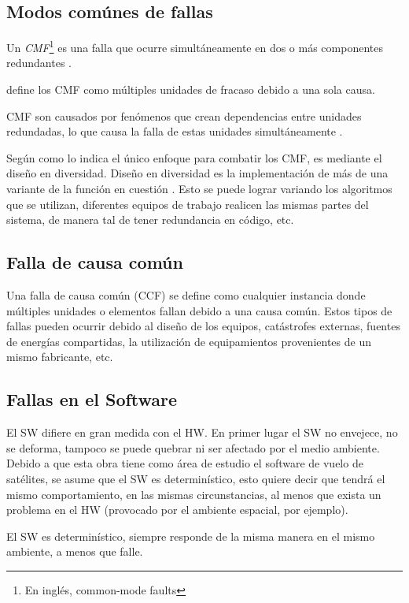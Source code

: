 \subsection{Modos comúnes de fallas}
Un \textit{\ac{CMF}}\footnote{En inglés, common-mode faults} es una falla que ocurre
simultáneamente en dos o más componentes redundantes \citep{FTDesign}.

\cite{Gangloff75} define los \ac{CMF} como múltiples unidades de fracaso debido a una sola causa.

\ac{CMF} son causados por fenómenos que crean dependencias entre unidades redundadas, lo que causa
la falla de estas unidades simultáneamente \citep{FTDesign}.

Según como lo indica \cite{FTDesign} el único enfoque para combatir los \ac{CMF}, es mediante el
diseño en diversidad. Diseño en diversidad es la implementación de más de una variante de la
función en cuestión \citep{FTDesign}. Esto se puede lograr variando los algoritmos que se utilizan,
diferentes equipos de trabajo realicen las mismas partes del sistema, de manera tal de tener
redundancia en código, etc.

\subsection{Falla de causa común}
Una falla de causa común (CCF) se define como cualquier instancia donde múltiples unidades o elementos fallan
debido a una causa común. Estos tipos de fallas pueden ocurrir debido al diseño de los equipos, catástrofes externas, fuentes de energías compartidas, la utilización de equipamientos provenientes de un mismo fabricante, etc. \citep{Rani11}

\subsection{Fallas en el Software}
El \ac{SW} difiere en gran medida con el \ac{HW}. En primer lugar el \ac{SW} no envejece, no se deforma, tampoco se puede quebrar ni ser afectado por el medio ambiente. Debido a que esta obra tiene como área de estudio el software de vuelo de satélites, se asume que el \ac{SW} es determinístico, esto quiere  decir que tendrá el mismo comportamiento, en las mismas circunstancias, al menos que exista un problema en el \ac{HW} (provocado por el ambiente espacial, por ejemplo).

El \ac{SW} es determinístico, siempre responde de la misma manera en el mismo ambiente, a menos que falle.

